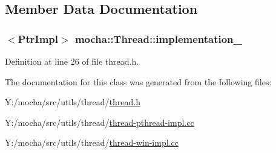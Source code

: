 \subsection{Member Data Documentation}
\hypertarget{classmocha_1_1_thread_a84ed7dce54ad56eaeb4165cd2d5a01d7}{
\subsubsection[{implementation\_\-}]{$<${\bf PtrImpl}$>$ {\bf mocha::Thread::implementation\_\-}}}
\label{classmocha_1_1_thread_a84ed7dce54ad56eaeb4165cd2d5a01d7}


Definition at line 26 of file thread.h.



The documentation for this class was generated from the following files:\begin{DoxyCompactItemize}
\item 
Y:/mocha/src/utils/thread/\hyperlink{thread_8h}{thread.h}\item 
Y:/mocha/src/utils/thread/\hyperlink{thread-pthread-impl_8cc}{thread-\/pthread-\/impl.cc}\item 
Y:/mocha/src/utils/thread/\hyperlink{thread-win-impl_8cc}{thread-\/win-\/impl.cc}\end{DoxyCompactItemize}

